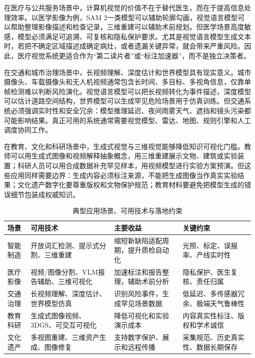\documentclass[UTF8,a4paper,12pt]{ctexart}
\newcommand{\model}[1]{\textsf{#1}}
\begin{document}
在医疗与公共服务场景中，计算机视觉的价值不在于替代医生，而在于提高信息处理效率。以医学影像为例，\model{SAM 2}一类模型可以辅助轮廓勾画，视觉语言模型可以帮助整理影像描述和检查记录，三维重建可以辅助术前规划。但医学场景高度敏感，模型必须满足可追溯、可复核和隐私保护要求。尤其是视觉语言模型生成文本时，若把不确定区域描述成确定病灶，或者遗漏关键异常，就会带来严重风险。因此，医疗视觉系统更适合作为“第二读片者”或“标注加速器”，而不是独立决策者。

在交通和城市治理场景中，长视频理解、深度估计和世界模型具有现实意义。城市摄像头、车载摄像头和无人机视频通常包含长时间、多目标、多视角信息，仅靠单帧检测难以判断风险演化。视觉语言模型可以把长视频转化为事件描述，深度模型可以估计道路空间结构，世界模型可以生成罕见危险场景用于仿真训练。但交通系统必须强调实时性和安全冗余：模型推理延迟、夜间雨雾天气、遮挡和镜头污染都可能影响结果。真正可用的系统通常需要视觉模型、雷达、地图、规则引擎和人工调度协同工作。

在教育、文化和科研场景中，生成式视觉与三维视觉能够降低知识可视化门槛。教师可以用生成式图像和视频解释抽象概念，用三维重建展示文物、建筑或实验装置；科研人员可以用合成数据补充罕见样本，用视频模型进行实验方案预演。但这些应用同样需要边界：生成内容必须标注来源，不能把生成图像当作真实实验结果；文化遗产数字化要尊重版权和文物保护规范；教育材料要避免把模型生成的错误细节包装成权威知识。

\begin{table}[htbp]
\centering
\small
\caption{典型应用场景、可用技术与落地约束}
\begin{tabularx}{\textwidth}{C{2.3cm}Y Y Y}
\toprule
\textbf{场景} & \textbf{可用技术} & \textbf{主要收益} & \textbf{关键约束} \\
\midrule
智能制造 & 开放词汇检测、提示式分割、三维重建 & 缩短新缺陷适配周期，提升质检自动化 & 光照、标定、误报率、产线实时性 \\
医疗影像 & 视频/图像分割、VLM报告辅助、三维可视化 & 加速标注和报告整理，辅助术前分析 & 隐私保护、医生复核、责任归属 \\
交通治理 & 长视频理解、深度估计、世界模型仿真 & 识别风险事件，生成罕见场景数据 & 低延迟、多传感器冗余、极端天气鲁棒性 \\
教育科研 & 生成式图像视频、3DGS、可交互可视化 & 降低可视化和实验演示成本 & 内容真实性标注、版权和学术诚信 \\
文化遗产 & 多视图重建、三维资产生成、图像修复 & 支持数字保护、展示和远程传播 & 采集规范、历史真实性、数据长期保存 \\
\bottomrule
\end{tabularx}
\end{table}
\end{document}
